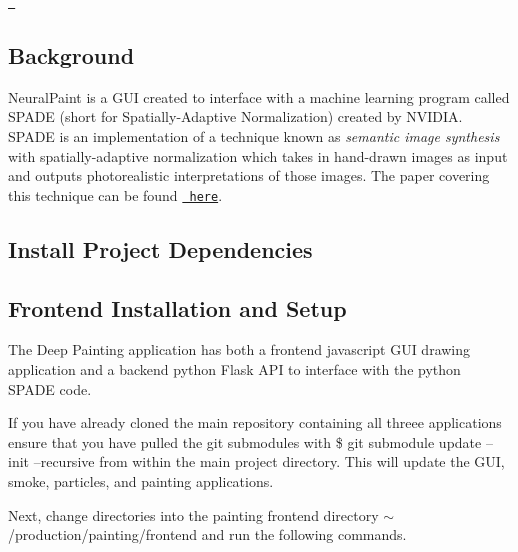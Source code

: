 \href{http://www.youtube.com/watch?v=p5U4NgVGAwg}{\texttt{ }}

\subsection*{Background}

Neural\+Paint is a G\+UI created to interface with a machine learning program called S\+P\+A\+DE (short for Spatially-\/\+Adaptive Normalization) created by N\+V\+I\+D\+IA. S\+P\+A\+DE is an implementation of a technique known as {\itshape semantic image synthesis} with spatially-\/adaptive normalization which takes in hand-\/drawn images as input and outputs photorealistic interpretations of those images. The paper covering this technique can be found \href{https://nvlabs.github.io/SPADE/}{\texttt{ here}}.

\subsection*{Install Project Dependencies}


\begin{DoxyCode}{0}
\end{DoxyCode}


\subsection*{Frontend Installation and Setup}

The Deep Painting application has both a frontend javascript G\+UI drawing application and a backend python Flask A\+PI to interface with the python S\+P\+A\+DE code.

If you have already cloned the main repository containing all threee applications ensure that you have pulled the git submodules with \textquotesingle{}\$ git submodule update --init --recursive\textquotesingle{} from within the main project directory. This will update the G\+UI, smoke, particles, and painting applications.

Next, change directories into the painting frontend directory {\ttfamily $\sim$/production/painting/frontend} and run the following commands.


\begin{DoxyCode}{0}
\DoxyCodeLine{}
\DoxyCodeLine{}
\DoxyCodeLine{}
\DoxyCodeLine{}
\end{DoxyCode}


